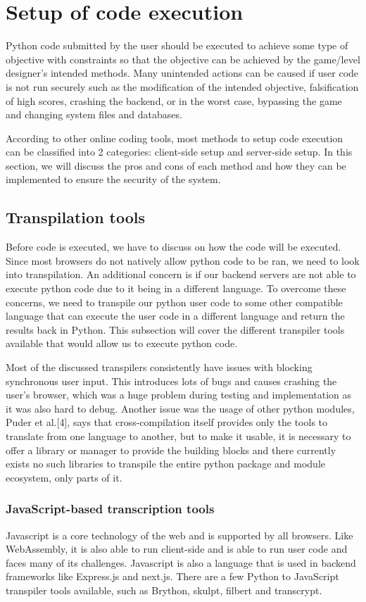 \section{Setup of code execution}
Python code submitted by the user should be executed to achieve some type of objective with constraints so that the objective can be achieved by the game/level designer's intended methods. Many unintended actions can be caused if user code is not run securely such as the modification of the intended objective, falsification of high scores, crashing the backend, or in the worst case, bypassing the game and changing system files and databases.

According to other online coding tools, most methods to setup code execution can be classified into 2 categories: client-side setup and server-side setup. In this section, we will discuss the pros and cons of each method and how they can be implemented to ensure the security of the system.

\subsection{Transpilation tools}
Before code is executed, we have to discuss on how the code will be executed.  Since most browsers do not natively allow python code to be ran, we need to look into transpilation. An additional concern is if our backend servers are not able to execute python code due to it being in a different language. To overcome these concerns, we need to transpile our python user code to some other compatible language that can execute the user code in a different language and return the results back in Python. This subsection will cover the different transpiler tools available that would allow us to execute python code. 

Most of the discussed transpilers consistently have issues with blocking synchronous user input. This introduces lots of bugs and causes crashing the user's browser, which was a huge problem during testing and implementation as it was also hard to debug.  Another issue was the usage of other python modules, Puder et al.[4], says that cross-compilation itself provides only the tools to translate from one language to another, but to make it usable, it is necessary to offer a library or manager to provide the building blocks and there currently exists no such libraries to transpile the entire python package and module ecosystem, only parts of it. 

\subsubsection{JavaScript-based transcription tools}
Javascript is a core technology of the web and is supported by all browsers. Like WebAssembly, it is also able to run client-side and is able to run user code and faces many of its challenges. Javascript is also a language that is used in backend frameworks like Express.js and next.js. There are a few Python to JavaScript transpiler tools available, such as Brython, skulpt, filbert and transcrypt.

